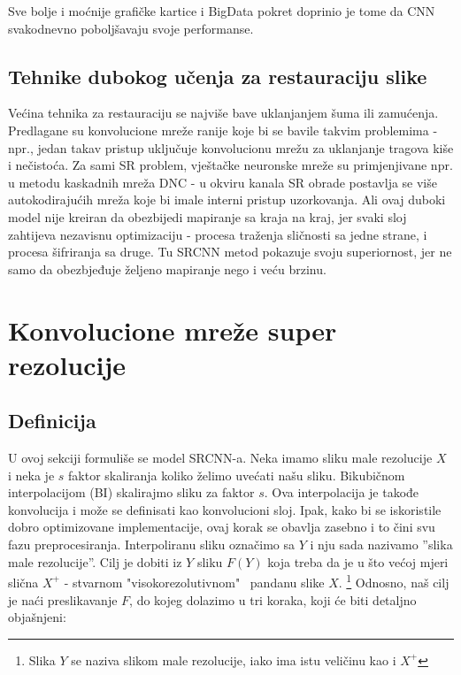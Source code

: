 \documentclass[12pt]{report}
\numberwithin{equation}{section}
\begin{document}
Sve bolje i moćnije grafičke kartice i BigData pokret doprinio je tome da CNN svakodnevno poboljšavaju svoje performanse.  


\section{Tehnike dubokog učenja za restauraciju slike}
Većina tehnika za restauraciju se najviše bave uklanjanjem šuma ili zamućenja. Predlagane su konvolucione mreže ranije koje bi se bavile takvim problemima - npr., jedan takav pristup uključuje konvolucionu mrežu za uklanjanje tragova kiše i nečistoća. Za sami SR problem, vještačke neuronske mreže su primjenjivane npr. u metodu kaskadnih mreža DNC -  u okviru kanala SR obrade postavlja se više autokodirajućih mreža koje bi imale interni pristup uzorkovanja. Ali ovaj duboki model nije kreiran da obezbijedi  mapiranje sa kraja na kraj, jer svaki sloj zahtijeva nezavisnu optimizaciju - procesa traženja sličnosti sa jedne strane, i procesa šifriranja sa druge. Tu SRCNN metod pokazuje svoju superiornost, jer ne samo da obezbjeđuje željeno mapiranje nego i veću brzinu.
  
  
\chapter{Konvolucione mreže super rezolucije}\label{ch3}

\section{Definicija}\label{ch2}

U ovoj sekciji formuliše se model SRCNN-a. Neka imamo sliku male rezolucije $X$ i neka je $s$ faktor skaliranja koliko želimo uvećati našu sliku. Bikubičnom interpolacijom (BI) skalirajmo sliku za faktor $s$. Ova interpolacija je takođe konvolucija i može se definisati kao konvolucioni sloj. Ipak, kako bi se iskoristile dobro optimizovane implementacije, ovaj korak se obavlja zasebno i to čini svu fazu preprocesiranja. Interpoliranu sliku označimo sa $Y$ i nju sada nazivamo ''slika male rezolucije''. Cilj je dobiti iz $Y$ sliku $F(Y)$ koja treba da je u što većoj mjeri slična $X^{+}$ - stvarnom "visokorezolutivnom"  \ pandanu slike $X$. \footnote{Slika $Y$ se naziva slikom male rezolucije, iako ima istu veličinu kao i $X^{+}$} Odnosno, naš cilj je naći preslikavanje $F$, do kojeg dolazimo u tri koraka, koji će biti detaljno objašnjeni:
\end{document}
